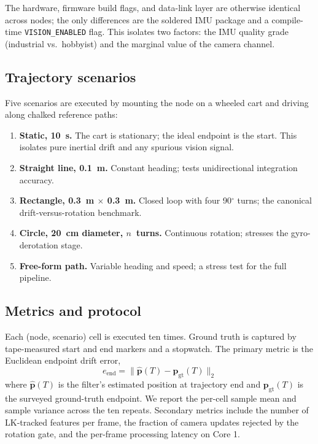 \documentclass[conference]{IEEEtran}
\begin{document}
The hardware, firmware build flags, and data-link layer are otherwise
identical across nodes; the only differences are the soldered IMU
package and a compile-time \texttt{VISION\_ENABLED} flag.  This
isolates two factors: the IMU quality grade (industrial vs.\ hobbyist)
and the marginal value of the camera channel.

\subsection{Trajectory scenarios}
\label{sec:scenarios}
Five scenarios are executed by mounting the node on a wheeled cart
and driving along chalked reference paths:

\begin{enumerate}
\item \textbf{Static, 10~s.}  The cart is stationary; the ideal
endpoint is the start.  This isolates pure inertial drift and any
spurious vision signal.
\item \textbf{Straight line, 0.1~m.}  Constant heading; tests
unidirectional integration accuracy.
\item \textbf{Rectangle, 0.3~m $\times$ 0.3~m.}  Closed loop
with four 90$^\circ$ turns; the canonical drift-versus-rotation
benchmark.
\item \textbf{Circle, 20~cm diameter, $n$~turns.}  Continuous
rotation; stresses the gyro-derotation stage.
\item \textbf{Free-form path.}  Variable heading and speed; a
stress test for the full pipeline.
\end{enumerate}

\subsection{Metrics and protocol}
Each (node, scenario) cell is executed ten times.  Ground truth is
captured by tape-measured start and end markers and a stopwatch.
The primary metric is the Euclidean endpoint drift error,
\begin{equation}
e_{\text{end}} = \lVert \hat{\mathbf{p}}(T) - \mathbf{p}_{\text{gt}}(T) \rVert_{2}
\end{equation}
where $\hat{\mathbf{p}}(T)$ is the filter's estimated position at
trajectory end and $\mathbf{p}_{\text{gt}}(T)$ is the surveyed
ground-truth endpoint.  We report the per-cell sample mean and
sample variance across the ten repeats.  Secondary metrics include
the number of LK-tracked features per frame, the fraction of
camera updates rejected by the rotation gate, and the per-frame
processing latency on Core 1.
\end{document}
